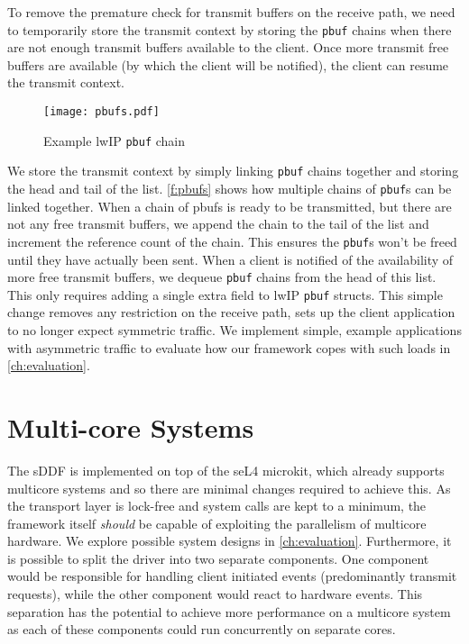 To remove the premature check for transmit buffers on the receive path, we need to 
temporarily store the transmit context by storing the \texttt{pbuf} chains when there are not enough transmit buffers
available to the client. Once more transmit free buffers are available (by which the client will be notified),
the client can resume the transmit context. 

\begin{figure}[h]
    \centering
    \texttt{[image: pbufs.pdf]}
    \caption{Example lwIP \texttt{pbuf} chain}
    \label{f:pbufs}
\end{figure}

We store the transmit context by simply linking \texttt{pbuf} chains together and storing the head and tail of the list. 
\autoref{f:pbufs} shows how multiple chains of \texttt{pbuf}s can be linked together. When a chain of pbufs is ready to
be transmitted, but there are not any free transmit buffers, we append the chain to the tail of the list and 
increment the reference count of the chain. This ensures the \texttt{pbuf}s won't be freed until they have actually been sent.
When a client is notified of the availability of more free transmit buffers, we dequeue \texttt{pbuf} chains from the head of
this list. This only requires adding a single extra field to lwIP \texttt{pbuf} structs. This simple change removes any
restriction on the receive path, sets up the client application to no longer expect symmetric traffic. We implement simple, example
applications with asymmetric traffic to evaluate how our framework copes with such loads in \autoref{ch:evaluation}.

\section{Multi-core Systems}\label{s:multicore}
The sDDF is implemented on top of the seL4 microkit, which already supports multicore systems
and so there are minimal changes required
to achieve this. As the transport layer is lock-free and system calls are kept to a minimum, the framework itself 
\emph{should} be capable of exploiting the parallelism of multicore hardware. We explore possible system designs in \autoref{ch:evaluation}.
Furthermore, it is possible to split the driver into two separate components. One component would be responsible for
handling client initiated events (predominantly transmit requests), while the other component would react to 
hardware events. This separation has the potential to achieve more performance on a multicore system as
each of these components could run concurrently on separate cores.\\

